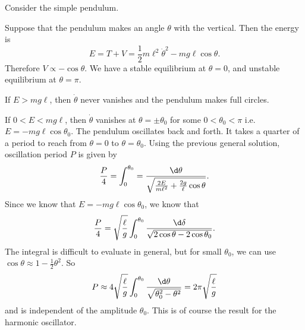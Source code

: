 \documentclass[a4paper]{article}
\begin{document}
\begin{eg}
  Consider the simple pendulum.
  \begin{center}
  \end{center}
  Suppose that the pendulum makes an angle $\theta$ with the vertical. Then the energy is
  \[
    E = T + V = \frac{1}{2}m\ell^2 \dot{\theta}^2 - mg\ell \cos\theta.
  \]
  Therefore $V\propto -\cos\theta$. We have a stable equilibrium at $\theta = 0 $, and unstable equilibrium at $\theta = \pi$.
  \begin{center}
  \end{center}
  If $E > mg\ell$, then $\dot{\theta}$ never vanishes and the pendulum makes full circles.

  If $0 < E < mg\ell$, then $\dot{\theta}$ vanishes at $\theta = \pm \theta_0$ for some $0 < \theta_0 < \pi$ i.e.\ $E = -mg\ell \cos\theta_0$. The pendulum oscillates back and forth. It takes a quarter of a period to reach from $\theta = 0$ to $\theta = \theta_0$. Using the previous general solution, oscillation period $P$ is given by
  \[
    \frac{P}{4} = \int_0^{\theta_0} = \frac{\d \theta}{\sqrt{\frac{2E}{m\ell^2} + \frac{2g}{\ell }\cos\theta}}.
  \]
  Since we know that $E = -mg\ell \cos \theta_0$, we know that
  \[
    \frac{P}{4} = \sqrt{\frac{\ell}{g}}\int_0^{\theta_0} \frac{\d \delta}{\sqrt{2\cos\theta - 2\cos\theta_0}}.
  \]
  The integral is difficult to evaluate in general, but for small $\theta_0$, we can use $\cos\theta \approx 1 - \frac{1}{2}\theta^2$. So
  \[
    P \approx 4\sqrt{\frac{\ell}{g}}\int_0^{\theta_0}\frac{\d \theta}{\sqrt{\theta_0^2 - \theta^2}} = 2\pi\sqrt{\frac{\ell}{g}}
  \]
  and is independent of the amplitude $\theta_0$. This is of course the result for the harmonic oscillator.
\end{eg}
\end{document}
